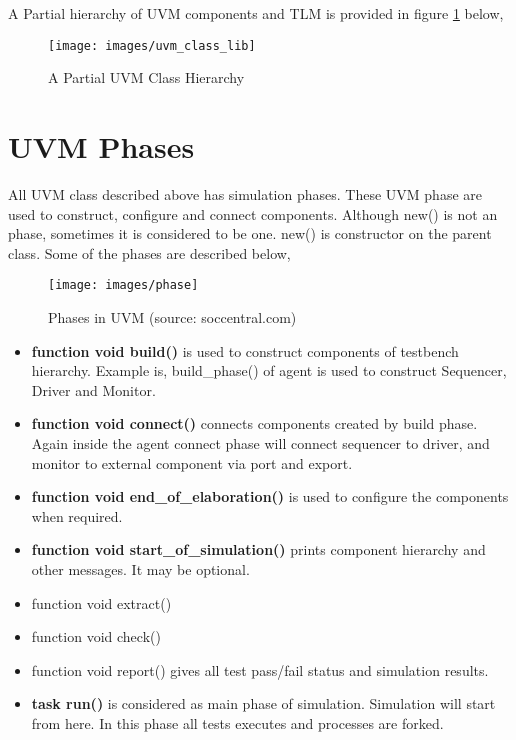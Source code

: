 A Partial hierarchy of UVM components and TLM is provided in figure \ref{uvmclass} below,

\begin{figure}[h]
\centering
\texttt{[image: images/uvm\_class\_lib]}
\caption{A Partial UVM Class Hierarchy \label{uvmclass}}
\end{figure}

\section{UVM Phases}

All UVM class described above has simulation phases. These UVM phase are used to construct, configure and connect components. Although new() is not an phase, sometimes it is considered to be one. new() is constructor on the parent class. Some of the phases are described below,

\begin{figure}[h]
	\centering
	\texttt{[image: images/phase]}
	\caption{Phases in UVM (source: soccentral.com)\label{phase}}
\end{figure}


	\begin{itemize}
		\item \textbf{function void build()}
		is used to construct components of testbench hierarchy. Example is, build\_phase() of agent is used to construct Sequencer, Driver and Monitor.
		\item \textbf{function void connect()}
		connects components created by build phase. Again inside the agent connect phase will connect sequencer to driver, and monitor to external component via port and export.
		\item \textbf{function void end\_of\_elaboration()}
		is used to configure the components when required.
		\item \textbf{function void start\_of\_simulation()}
		prints component hierarchy and other messages. It may be optional.
		\item function void extract()
		\item function void check()
		\item function void report()
		gives all test pass/fail status and simulation results.
		\item \textbf{task run()}
		is considered as main phase of simulation. Simulation will start from here. In this phase all tests executes and processes are forked.
	\end{itemize}
	
